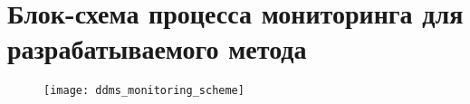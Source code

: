 \chapter{Блок-схема процесса мониторинга для разрабатываемого метода}
\label{app:DDMS:MonitoringScheme}
\begin{figure}[H]
\texttt{[image: ddms\_monitoring\_scheme]}
\end{figure}